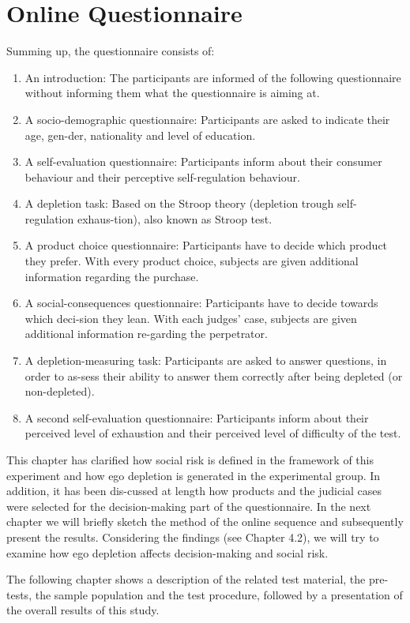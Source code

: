 \section{Online Questionnaire}
Summing up, the questionnaire consists of:
\begin{enumerate}[label=\emph{\alph*}.]
\item An introduction: The participants are informed of the following questionnaire without informing them what the questionnaire is aiming at. 
\item A socio-demographic questionnaire: Participants are asked to indicate their age, gen-der, nationality and level of education.
\item A self-evaluation questionnaire: Participants inform about their consumer behaviour and their perceptive self-regulation behaviour.
\item A depletion task: Based on the Stroop theory (depletion trough self-regulation exhaus-tion), also known as Stroop test.  
\item A product choice questionnaire: Participants have to decide which product they prefer. With every product choice, subjects are given additional information regarding the purchase.
\item A social-consequences questionnaire: Participants have to decide towards which deci-sion they lean. With each judges’ case, subjects are given additional information re-garding the perpetrator.
\item A depletion-measuring task: Participants are asked to answer questions, in order to as-sess their ability to answer them correctly after being depleted (or non-depleted).
\item A second self-evaluation questionnaire: Participants inform about their perceived level of exhaustion and their perceived level of difficulty of the test.
\end{enumerate}

This chapter has clarified how social risk is defined in the framework of this experiment and how ego depletion is generated in the experimental group.  In addition, it has been dis-cussed at length how products and the judicial cases were selected for the decision-making part of the questionnaire. In the next chapter we will briefly sketch the method of the online sequence and subsequently present the results. Considering the findings (see Chapter 4.2), we will try to examine how ego depletion affects decision-making and social risk. \par
The following chapter shows a description of the related test material, the pre-tests, the sample population and the test procedure, followed by a presentation of the overall results of this study.\par

